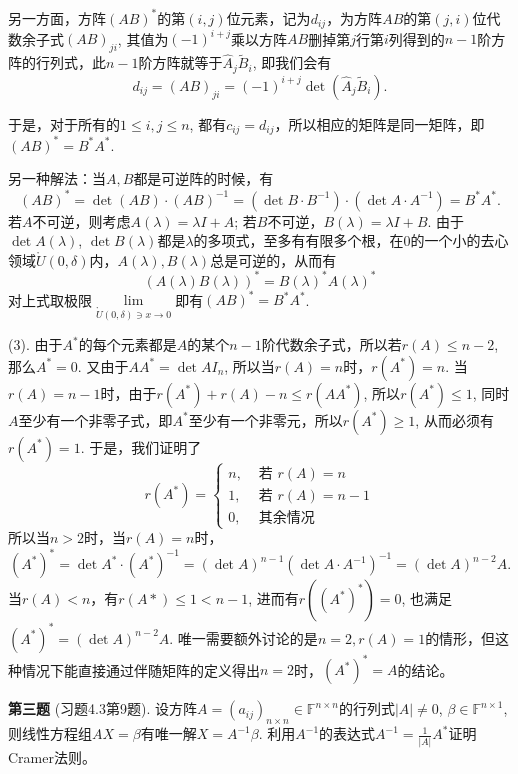 另一方面，方阵$(AB)^*$的第$(i,j)$位元素，记为$d_{ij}$，为方阵$AB$的第$(j,i)$位代数余子式$(AB)_{ji}$, 其值为$(-1)^{i+j}$乘以方阵$AB$删掉第$j$行第$i$列得到的$n-1$阶方阵的行列式，此$n-1$阶方阵就等于$\widehat{A}_j \widetilde{B}_i$, 即我们会有
$$d_{ij} = (AB)_{ji} = (-1)^{i+j} \det(\widehat{A}_j \widetilde{B}_i).$$

于是，对于所有的$1\leqslant i,j \leqslant n$, 都有$c_{ij} = d_{ij}$，所以相应的矩阵是同一矩阵，即$(AB)^* = B^*A^*$.

另一种解法：当$A,B$都是可逆阵的时候，有
$$(AB)^* = \det(AB) \cdot (AB)^{-1} = (\det B \cdot B^{-1}) \cdot (\det A \cdot A^{-1}) = B^*A^*.$$
若$A$不可逆，则考虑$A(\lambda) = \lambda I + A$; 若$B$不可逆，$B(\lambda) = \lambda I + B$. 由于$\det A(\lambda)$, $\det B(\lambda)$都是$\lambda$的多项式，至多有有限多个根，在$0$的一个小的去心领域$\mathring{U}(0,\delta)$内，$A(\lambda), B(\lambda)$总是可逆的，从而有
$$(A(\lambda)B(\lambda))^* = B(\lambda)^*A(\lambda)^*$$
对上式取极限$\lim\limits_{\mathring{U}(0,\delta) \ni x\to 0}$即有$(AB)^* = B^*A^*$.

(3). 由于$A^*$的每个元素都是$A$的某个$n-1$阶代数余子式，所以若$r(A)\leqslant n-2$, 那么$A^* = 0$. 又由于$AA^* = \det A I_n$, 所以当$r(A) = n$时，$r(A^*) = n$. 当$r(A) = n-1$时，由于$r(A^*) + r(A) - n \leqslant r(AA^*)$, 所以$r(A^*) \leqslant 1$, 同时$A$至少有一个非零子式，即$A^*$至少有一个非零元，所以$r(A^*) \geqslant 1$, 从而必须有$r(A^*) = 1$. 于是，我们证明了
$$r(A^*) = \begin{cases} n, & \text{ 若 } r(A) = n \\ 1, & \text{ 若 } r(A) = n-1 \\ 0, & \text{ 其余情况} \end{cases}$$
所以当$n > 2$时，当$r(A) = n$时，
$$(A^*)^* = \det A^* \cdot (A^*)^{-1} = (\det A)^{n-1} (\det A \cdot A^{-1})^{-1} = (\det A)^{n-2} A.$$
当$r(A) < n$，有$r(A*) \leqslant 1 < n-1$, 进而有$r((A^*)^*) = 0$, 也满足$(A^*)^* = (\det A)^{n-2}A$. 唯一需要额外讨论的是$n=2, r(A) = 1$的情形，但这种情况下能直接通过伴随矩阵的定义得出$n = 2$时，$(A^*)^* = A$的结论。

\fi  %

\newpageorvspace

{\bf 第三题} (习题4.3第9题). 设方阵$A = (a_{ij})_{n\times n} \in \mathbb{F}^{n\times n}$的行列式$|A| \neq 0$, $\beta\in\mathbb{F}^{n\times 1}$, 则线性方程组$AX=\beta$有唯一解$X = A^{-1}\beta$. 利用$A^{-1}$的表达式$A^{-1} = \frac{1}{|A|}A^*$证明Cramer法则。

\ifIncludeAnswer

